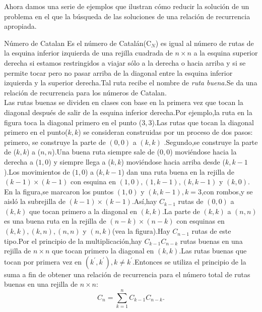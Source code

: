 Ahora damos una serie de ejemplos que ilustran cómo reducir la solución de un problema en el que la búsqueda de las soluciones de una relación de recurrencia apropiada.
\begin{example}{Número de Catalan}
Es el número de Catalán(C$ _{N} $) es igual al número de rutas de la esquina inferior izquierda de una rejilla cuadrada de $ n \times n $ a la esquina superior derecha si estamos restringidos a viajar sólo a la derecha o hacia arriba y si se permite tocar pero no pasar arriba de la diagonal entre la esquina inferior izquierda y la superior derecha.Tal ruta recibe el nombre de \emph{ruta buena.}Se da una relación de recurrencia para los números de Catalan.\\
Las rutas buenas se dividen en clases con base en  la primera vez que tocan la diagonal después de salir de la esquina inferior derecha.Por ejemplo,la ruta en la figura toca la diagonal primero en el punto ($3,3$).Las rutas que tocan la diagonal primero en el punto($ k,k $) se consideran construidas por un proceso de dos pasos:
primero, se construye la parte de $ (0,0) $ a $ (k,k) $ .Segundo,se construye la parte de ($ k,k $) a ($ n,n $).Una buena ruta siempre sale de ($ 0,0 $) moviéndose hacia la derecha a ($ 1,0 $) y siempre llega a ($ k,k $) moviéndose hacia arriba desde ($ k,k-1 $).Los movimientos de ($ 1,0 $) a ($ k,k-1 $) dan una ruta buena en la rejilla de $ (k-1) \times (k-1) $ con esquina en $ (1,0),(1,k-1),(k,k-1)$ y $ (k,0) .$En la figura,se marcaron los puntos $ (1,0) $ y $ (k,k-1),k=3 $,con rombos,y se aisló la subrejilla de $ (k-1) \times (k-1) $.Así,hay $ C_{k-1} $ rutas de $ (0,0) $ a $ (k,k) $ que tocan primero a la diagonal en $ (k,k) $.La parte de $ (k,k) $ a $ (n,n) $ es una buena ruta en la rejilla de $ (n-k) \times (n-k) $ con esquinas en $ (k,k),(k,n),(n,n) $ y $ (n,k) $(vea la figura).Hay $ C_{n-1} $ rutas de este tipo.Por el principio de la multiplicación,hay $ C_{k-1}C_{n-k}$ rutas buenas en una rejilla de $ n \times n $ que tocan primero la diagonal en $ (k,k)$.Las rutas buenas que tocan por primera vez en $ (k^{\prime},k^{\prime}), k \neq k^{\prime} .$Entonces se utiliza el principio de la suma a fin de obtener una relación de recurrencia para el número total de rutas buenas en una rejilla de $ n \times n $:
$$
C_{n}=\sum_{k=1}^{n}C_{k-1}C_{n-k}.
$$

\end{example}
%
%
%
%
%
%
%
%
%


